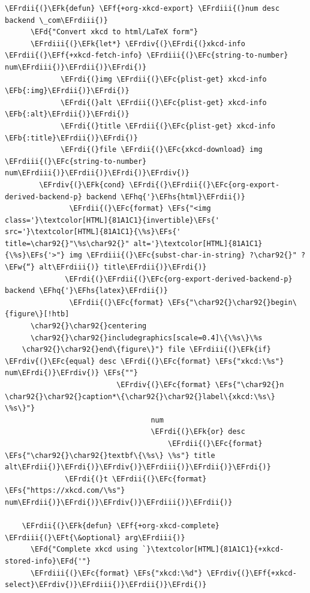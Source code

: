 \documentclass{scrartcl}
\newcommand{\EFk}[1]{\textcolor{EFk}{#1}} %
\newcommand{\EFd}[1]{\textcolor{EFd}{#1}} %
\newcommand{\EFt}[1]{\textcolor{EFt}{#1}} %
\newcommand{\EFs}[1]{\textcolor{EFs}{#1}} %
\newcommand{\EFw}[1]{\textcolor{EFw}{#1}} %
\newcommand{\EFb}[1]{\textcolor{EFb}{#1}} %
\newcommand{\EFc}[1]{\textcolor{EFc}{#1}} %
\newcommand{\EFf}[1]{\textcolor{EFf}{#1}} %
\newcommand{\EFhq}[1]{#1} %
\newcommand{\EFhs}[1]{#1} %
\newcommand{\EFrdi}[1]{#1} %
\newcommand{\EFrdii}[1]{#1} %
\newcommand{\EFrdiii}[1]{#1} %
\newcommand{\EFrdiv}[1]{#1} %
\begin{document}
\begin{Code}
\begin{Verbatim}[]
	\EFrdii{(}\EFk{defun} \EFf{+org-xkcd-export} \EFrdiii{(}num desc backend \_com\EFrdiii{)}
	  \EFd{"Convert xkcd to html/LaTeX form"}
	  \EFrdiii{(}\EFk{let*} \EFrdiv{(}\EFrdi{(}xkcd-info \EFrdii{(}\EFf{+xkcd-fetch-info} \EFrdiii{(}\EFc{string-to-number} num\EFrdiii{)}\EFrdii{)}\EFrdi{)}
	         \EFrdi{(}img \EFrdii{(}\EFc{plist-get} xkcd-info \EFb{:img}\EFrdii{)}\EFrdi{)}
	         \EFrdi{(}alt \EFrdii{(}\EFc{plist-get} xkcd-info \EFb{:alt}\EFrdii{)}\EFrdi{)}
	         \EFrdi{(}title \EFrdii{(}\EFc{plist-get} xkcd-info \EFb{:title}\EFrdii{)}\EFrdi{)}
	         \EFrdi{(}file \EFrdii{(}\EFc{xkcd-download} img \EFrdiii{(}\EFc{string-to-number} num\EFrdiii{)}\EFrdii{)}\EFrdi{)}\EFrdiv{)}
	    \EFrdiv{(}\EFk{cond} \EFrdi{(}\EFrdii{(}\EFc{org-export-derived-backend-p} backend \EFhq{'}\EFhs{html}\EFrdii{)}
	           \EFrdii{(}\EFc{format} \EFs{"<img class='}\textcolor[HTML]{81A1C1}{invertible}\EFs{' src='}\textcolor[HTML]{81A1C1}{\%s}\EFs{' title=\char92{}"\%s\char92{}" alt='}\textcolor[HTML]{81A1C1}{\%s}\EFs{'>"} img \EFrdiii{(}\EFc{subst-char-in-string} ?\char92{}" ?\EFw{“} alt\EFrdiii{)} title\EFrdii{)}\EFrdi{)}
	          \EFrdi{(}\EFrdii{(}\EFc{org-export-derived-backend-p} backend \EFhq{'}\EFhs{latex}\EFrdii{)}
	           \EFrdii{(}\EFc{format} \EFs{"\char92{}\char92{}begin\{figure\}[!htb]
	  \char92{}\char92{}centering
	  \char92{}\char92{}includegraphics[scale=0.4]\{\%s\}\%s
	\char92{}\char92{}end\{figure\}"} file \EFrdiii{(}\EFk{if} \EFrdiv{(}\EFc{equal} desc \EFrdi{(}\EFc{format} \EFs{"xkcd:\%s"} num\EFrdi{)}\EFrdiv{)} \EFs{""}
	                      \EFrdiv{(}\EFc{format} \EFs{"\char92{}n  \char92{}\char92{}caption*\{\char92{}\char92{}label\{xkcd:\%s\} \%s\}"}
	                              num
	                              \EFrdi{(}\EFk{or} desc
	                                  \EFrdii{(}\EFc{format} \EFs{"\char92{}\char92{}textbf\{\%s\} \%s"} title alt\EFrdii{)}\EFrdi{)}\EFrdiv{)}\EFrdiii{)}\EFrdii{)}\EFrdi{)}
	          \EFrdi{(}t \EFrdii{(}\EFc{format} \EFs{"https://xkcd.com/\%s"} num\EFrdii{)}\EFrdi{)}\EFrdiv{)}\EFrdiii{)}\EFrdii{)}
	
	\EFrdii{(}\EFk{defun} \EFf{+org-xkcd-complete} \EFrdiii{(}\EFt{\&optional} arg\EFrdiii{)}
	  \EFd{"Complete xkcd using `}\textcolor[HTML]{81A1C1}{+xkcd-stored-info}\EFd{'"}
	  \EFrdiii{(}\EFc{format} \EFs{"xkcd:\%d"} \EFrdiv{(}\EFf{+xkcd-select}\EFrdiv{)}\EFrdiii{)}\EFrdii{)}\EFrdi{)}
\end{Verbatim}
\end{Code}
\end{document}
